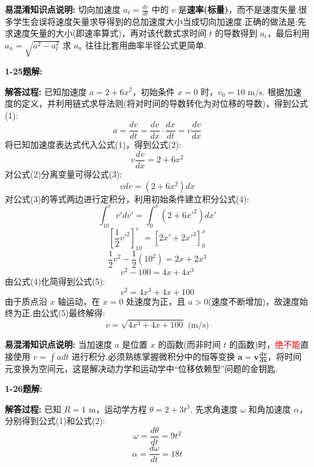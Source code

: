 \textbf{易混淆知识点说明:}
切向加速度 $a_t = \frac{dv}{dt}$ 中的 $v$ 是\textbf{速率(标量)}，而不是速度矢量.很多学生会误将速度矢量求导得到的总加速度大小当成切向加速度.正确的做法是:先求速度矢量的大小(即速率算式)，再对该代数式求时间 $t$ 的导数得到 $a_t$，最后利用 $a_n = \sqrt{a^2 - a_t^2}$ 求 $a_n$ 往往比套用曲率半径公式更简单.

\vspace{2em}

\textbf{1-25题解:}


\textbf{解答过程:}
已知加速度 $a = 2 + 6x^2$，初始条件 $x=0$ 时，$v_0 = 10 \text{ m/s}$.
根据加速度的定义，并利用链式求导法则(将对时间的导数转化为对位移的导数)，得到公式(1):
\begin{equation}
	a = \frac{dv}{dt} = \frac{dv}{dx} \cdot \frac{dx}{dt} = v \frac{dv}{dx}
\end{equation}
将已知加速度表达式代入公式(1)，得到公式(2):
\begin{equation}
	v \frac{dv}{dx} = 2 + 6x^2
\end{equation}
对公式(2)分离变量可得公式(3):
\begin{equation}
	v dv = (2 + 6x^2) dx
\end{equation}
对公式(3)的等式两边进行定积分，利用初始条件建立积分公式(4):
\begin{equation}
	\int_{10}^{v} v' dv' = \int_{0}^{x} (2 + 6x'^2) dx'
\end{equation}
$$ \left[ \frac{1}{2}v'^2 \right]_{10}^{v} = \left[ 2x' + 2x'^3 \right]_{0}^{x} $$
$$ \frac{1}{2}v^2 - \frac{1}{2}(10^2) = 2x + 2x^3 $$
$$ v^2 - 100 = 4x + 4x^3 $$
由公式(4)化简得到公式(5):
\begin{equation}
	v^2 = 4x^3 + 4x + 100
\end{equation}
由于质点沿 $x$ 轴运动，在 $x=0$ 处速度为正，且 $a > 0$(速度不断增加)，故速度始终为正.由公式(5)最终解得:
$$ v = \sqrt{4x^3 + 4x + 100} \text{ (m/s)} $$

\textbf{易混淆知识点说明:}
当加速度 $a$ 是位置 $x$ 的函数(而非时间 $t$ 的函数)时，\textcolor{red}{绝不能}直接使用 $v = \int a dt$ 进行积分.必须熟练掌握微积分中的恒等变换 $\mathbf{a = v \frac{dv}{dx}}$，将时间元变换为空间元，这是解决动力学和运动学中“位移依赖型”问题的金钥匙.

\vspace{2em}

\textbf{1-26题解:}


\textbf{解答过程:}
已知 $R = 1\text{ m}$，运动学方程 $\theta = 2 + 3t^3$.
先求角速度 $\omega$ 和角加速度 $\alpha$，分别得到公式(1)和公式(2):
\begin{equation}
	\omega = \frac{d\theta}{dt} = 9t^2
\end{equation}
\begin{equation}
	\alpha = \frac{d\omega}{dt} = 18t
\end{equation}

